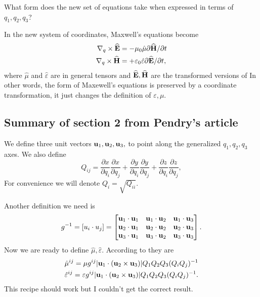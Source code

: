 \documentclass{amsart}
\begin{document}
 What form does the new set of equations take when
expressed in terms of $q_1,q_2,q_3$?

 In the new system of coordinates, Maxwell's equations become
\begin{align*}
  \nabla_q \times \widehat{\textbf{E}} &= -\mu_0\hat{\mu} \partial \widehat{\textbf{H}}/\partial t\\
  \nabla_q \times \widehat{\textbf{H}} &= +\varepsilon_0 \hat{\varepsilon} \partial \widehat{\textbf{E}}/\partial t,
\end{align*}
where $\hat{\mu}$ and $\hat{\varepsilon}$ are in general tensors and $\widehat{\textbf{E}},\widehat{\textbf{H}}$ are the transformed versions of 
In other words, the form of Maxewell's equations is preserved by a coordinate transformation, it just changes the definition of $\varepsilon,\mu$.
\subsection{Summary of section 2 from Pendry's article}
We define three unit vectors $\textbf{u}_1,\textbf{u}_2,\textbf{u}_3,$ to point along the generalized $q_1,q_2,q_3$ axes.
We also define
\begin{equation}\label{matrixQ}
  Q_{ij}=\frac{\partial x}{\partial q_i}\frac{\partial x}{\partial q_j}+\frac{\partial y}{\partial q_i}\frac{\partial y}{\partial q_j}+\frac{\partial z}{\partial q_i}\frac{\partial z}{\partial q_j},
\end{equation}
For convenience we will denote $Q_i=\sqrt{Q_{ii}}$.

Another definition we need is
\begin{equation}\label{matrixg}
  g^{-1}=[u_i\cdot u_j]=\begin{bmatrix}
    \textbf{u}_1\cdot \textbf{u}_1 & \textbf{u}_1\cdot \textbf{u}_2 & \textbf{u}_1\cdot \textbf{u}_3 \\
    \textbf{u}_2\cdot \textbf{u}_1 & \textbf{u}_2\cdot \textbf{u}_2 & \textbf{u}_2\cdot \textbf{u}_3 \\
    \textbf{u}_3\cdot \textbf{u}_1 & \textbf{u}_3\cdot \textbf{u}_2 & \textbf{u}_3\cdot \textbf{u}_3
  \end{bmatrix}.
\end{equation}
Now we are ready to define $\hat{\mu},\hat{\varepsilon}$. According to \cite{ward96} they are
\begin{align}
  \hat{\mu}^{ij}=\mu g^{ij}|\textbf{u}_1\cdot(\textbf{u}_2\times \textbf{u}_3)|Q_1Q_2Q_3(Q_iQ_j)^{-1}\\
  \hat{\varepsilon}^{ij}=\varepsilon g^{ij}|\textbf{u}_1\cdot(\textbf{u}_2\times \textbf{u}_3)|Q_1Q_2Q_3(Q_iQ_j)^{-1} \nonumber.
\end{align}
This recipe should work but I couldn't get the correct result.

\printbibliography
\end{document}
